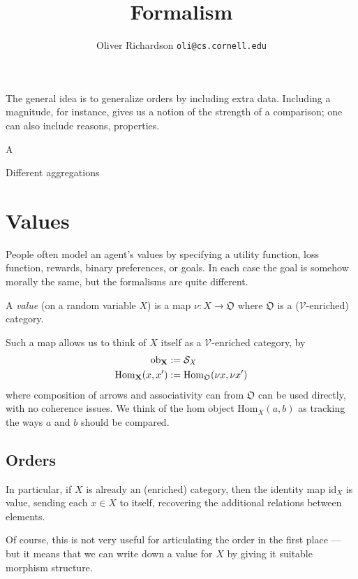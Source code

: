 \documentclass{article}
\title{Formalism}
\author{Oliver Richardson  \texttt{oli@cs.cornell.edu}}
\begin{document}
	
	The general idea is to generalize orders by including extra data. Including a magnitude, for instance, gives us a notion of the strength of a comparison; one can also include reasons, properties. 
	
	A 
	
	Different aggregations 
	
	
	\section{Values}
	
	People often model an agent's values by specifying a utility function, loss function, rewards, binary preferences, or goals. In each case the goal is somehow morally the same, but the formalisms are quite different.
	
	\begin{defn}
		A \textit{value} (on a random variable $X$) is a map $\nu : X  \to \mathfrak O$ where $\mathfrak O$ is a ($\mathcal V$-enriched) category.
	\end{defn}

	Such a map allows us to think of $X$ itself as a $\mathcal V$-enriched category, by
	\begin{align*}
	\mathrm{ob}_{\bf X} &:= \mathcal S_X \\
	\mathrm{Hom}_{\bf X}(x, x') &:= \mathrm{Hom}_{\mathfrak O}(\nu x, \nu x')
	\end{align*}
	where composition of arrows and associativity can from $\mathfrak O$ can be used directly, with no coherence issues.  We think of the hom object $\mathrm{Hom}_X(a,b)$ as tracking the ways $a$ and $b$ should be compared.
	
	\subsection{Orders}
	
	\begin{example}
		In particular, if $X$ is already an (enriched) category, then the identity map $\mathrm{id}_X$ is value, sending each $x \in X$ to itself, recovering the additional relations between elements. 
	\end{example}
	
	Of course, this is not very useful for articulating the order in the first place --- but it means that we can write down a value for $X$ by giving it suitable morphism structure.
	
\end{document}
